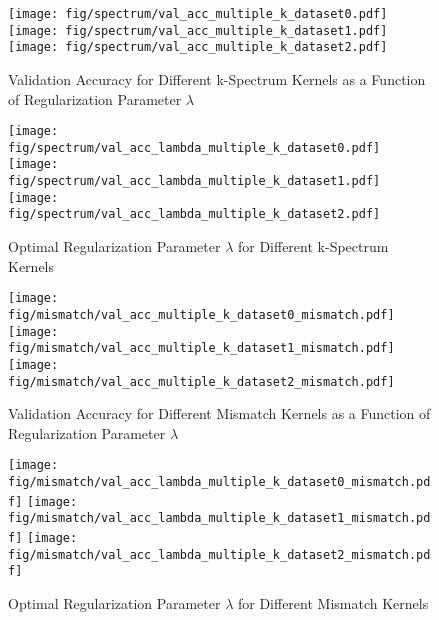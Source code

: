 \documentclass[final]{cvpr}
\begin{document}
	{\small
		
		
	}
	
	\newpage
	
	\begin{figure}[h!]
	\centering
	\texttt{[image: fig/spectrum/val\_acc\_multiple\_k\_dataset0.pdf]}
	\texttt{[image: fig/spectrum/val\_acc\_multiple\_k\_dataset1.pdf]}
	\texttt{[image: fig/spectrum/val\_acc\_multiple\_k\_dataset2.pdf]}
	\caption{\centering Validation Accuracy for Different k-Spectrum Kernels as a Function of Regularization Parameter $\lambda$}
	\label{fig:acc_spectrum}
	\end{figure}
	
	\newpage
	
	\begin{figure}[h!]
		\centering
		\texttt{[image: fig/spectrum/val\_acc\_lambda\_multiple\_k\_dataset0.pdf]}
		\texttt{[image: fig/spectrum/val\_acc\_lambda\_multiple\_k\_dataset1.pdf]}
		\texttt{[image: fig/spectrum/val\_acc\_lambda\_multiple\_k\_dataset2.pdf]}
		\caption{\centering Optimal Regularization Parameter $\lambda$ for Different k-Spectrum Kernels}
		\label{fig:lambda_spectrum}
	\end{figure}
	
	\begin{figure}[h!]
		\centering
		\texttt{[image: fig/mismatch/val\_acc\_multiple\_k\_dataset0\_mismatch.pdf]}
		\texttt{[image: fig/mismatch/val\_acc\_multiple\_k\_dataset1\_mismatch.pdf]}
		\texttt{[image: fig/mismatch/val\_acc\_multiple\_k\_dataset2\_mismatch.pdf]}
		\caption{\centering Validation Accuracy for Different Mismatch Kernels as a Function of Regularization Parameter $\lambda$}
		\label{fig:acc_mismatch}
	\end{figure}
	
	\newpage
	
	\begin{figure}[h!]
		\centering
		\texttt{[image: fig/mismatch/val\_acc\_lambda\_multiple\_k\_dataset0\_mismatch.pdf]}
		\texttt{[image: fig/mismatch/val\_acc\_lambda\_multiple\_k\_dataset1\_mismatch.pdf]}
		\texttt{[image: fig/mismatch/val\_acc\_lambda\_multiple\_k\_dataset2\_mismatch.pdf]}
		\caption{\centering Optimal Regularization Parameter $\lambda$ for Different Mismatch Kernels}
		\label{fig:lambda_mismatch}
	\end{figure}
		
\end{document}

